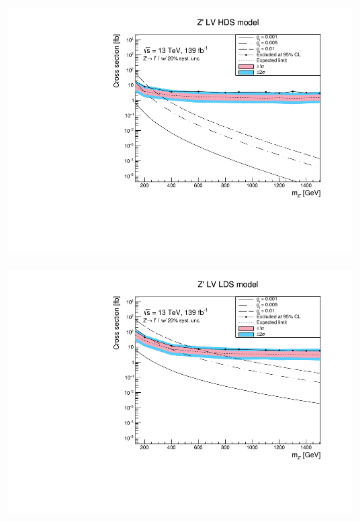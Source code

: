 \documentclass[12pt, a4paper]{book}
\begin{document}
\begin{figure}[!ht]
   \hfill
   \begin{subfigure}[b]{0.49\textwidth}
      \centering
      \includegraphics[width=1\textwidth]{Limits/LV_HDS/mass_exclusion_comb.pdf}
   \end{subfigure}
   \hfill
   \begin{subfigure}[b]{0.49\textwidth}
      \centering
      \includegraphics[width=1\textwidth]{Limits/LV_LDS/mass_exclusion_comb.pdf}
   \end{subfigure}
   \hfill
	\begin{subfigure}[b]{0.49\textwidth}
      \centering

\end{subfigure}
\end{figure}
\end{document}
